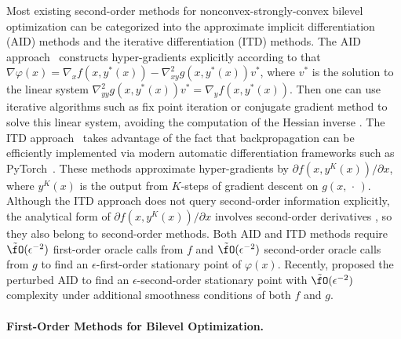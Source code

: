 \documentclass{article}
\begin{document}
Most existing second-order methods for nonconvex-strongly-convex bilevel optimization can be categorized into
the approximate implicit differentiation (AID) methods  and the iterative differentiation
(ITD) methods. The AID approach~\citep{liao2018reviving,ji2021bilevel,ghadimi2018approximation,lorraine2020optimizing} constructs hyper-gradients explicitly according to  that $\nabla \varphi(x) = \nabla_x f(x,y^*(x)) - \nabla_{xy}^2 g(x,y^*(x)) v^*$, where $v^* $ is the solution to the linear system $\nabla_{yy}^2 g(x,y^*(x)) v^* =\nabla_y f(x,y^*(x)) $. Then one can use
iterative algorithms such as fix point iteration or conjugate gradient method to solve this linear system, avoiding the computation of the Hessian inverse \citep{grazzi2020iteration,ji2021bilevel,hong2023two}. 
The ITD approach~\citep{maclaurin2015gradient,shaban2019truncated,domke2012generic,franceschi2017forward,franceschi2018bilevel}  takes advantage of the fact that backpropagation can be efficiently implemented via modern
automatic differentiation frameworks such as PyTorch~\citep{paszke2019pytorch}. These methods approximate hyper-gradients by $\partial f(x,y^K(x)) / \partial x $, where $y^K(x)$ is the output from $K$-steps of gradient descent on $g(x,\,\cdot\,)$. Although the ITD approach does not query second-order information explicitly, the analytical form of $\partial f(x,y^K(x)) / \partial x $ involves second-order derivatives \citep{ji2021bilevel}, so they also belong to second-order methods. Both AID and ITD methods require $\tilde \fO(\epsilon^{-2})$ first-order oracle calls from $f$ and $\tilde \fO(\epsilon^{-2})$ second-order oracle calls from $g$ to find an $\epsilon$-first-order stationary point of $\varphi(x)$. Recently, \citet{huang2022efficiently} proposed the perturbed AID to find an $\epsilon$-second-order stationary point with $\tilde \fO(\epsilon^{-2})$ complexity under additional smoothness conditions of both $f$ and $g$. 

\paragraph{First-Order Methods for Bilevel Optimization.}
\end{document}
